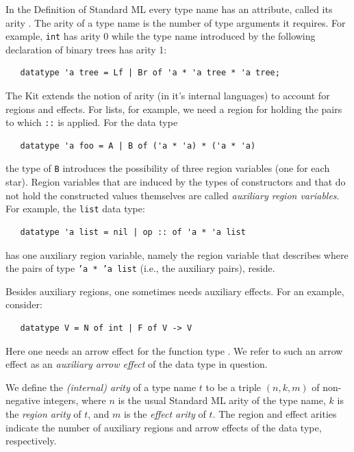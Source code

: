 \documentclass[12pt]{book}
\begin{document}
In the Definition of Standard ML every type name has an attribute,
called its arity \cite[page 15]{mthm97}. The arity of a type name is the number
of type arguments it requires. For example, {\tt int} has arity 0
while the type name introduced by the following declaration of binary
trees has arity 1:
%
%
%
%
\begin{verbatim}
   datatype 'a tree = Lf | Br of 'a * 'a tree * 'a tree;
\end{verbatim}

The Kit extends the notion of arity (in it's internal languages) to
account for regions and effects. For lists, for example, we need a
region for holding the pairs to which {\tt ::} is applied. For the
data type
\begin{verbatim}
   datatype 'a foo = A | B of ('a * 'a) * ('a * 'a)
\end{verbatim}
the type of {\tt B} introduces the possibility of three region
variables (one for each star). Region variables that are induced by
the types of constructors and that do not hold the constructed values
themselves are called
%
{\em auxiliary region variables}. For example, the {\tt list} data
type:
\begin{verbatim}
   datatype 'a list = nil | op :: of 'a * 'a list
\end{verbatim}
has one auxiliary region variable, namely the region variable that
describes where the pairs of type {\tt 'a * 'a list} (i.e., the
auxiliary
%
pairs), reside.

Besides auxiliary regions, one sometimes needs auxiliary effects.  For
an example, consider:
\begin{verbatim}
   datatype V = N of int | F of V -> V
\end{verbatim}
Here one needs an arrow effect for the function type .
We refer to such an arrow effect as an
%
{\em auxiliary arrow effect} of the data type in question.


We define the {\em (internal) arity} of a type name $t$ to be a triple
$(n,k,m)$ of non-negative integers, where $n$ is the usual Standard ML
arity of the type name, $k$ is the
%
{\em region arity} of $t$, and $m$ is the 
%
{\em effect arity} of $t$. The region and effect arities indicate the
number of auxiliary regions and arrow effects of the data type,
respectively.
\end{document}
